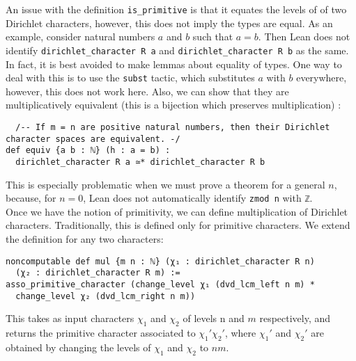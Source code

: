 \documentclass[11pt]{article}
\newcommand{\lean}[1]{\texttt{#1}\xspace} %
\begin{document}
An issue with the definition \lean{is\_primitive} is that it equates the levels of of two Dirichlet characters, 
however, this does not imply the types are equal. As an example, consider natural numbers $a$ and $b$ such that 
$a = b$. Then Lean does not identify \lean{dirichlet\_character R a} and \lean{dirichlet\_character R b} as the 
same. In fact, it is best avoided to make lemmas about equality of types. One way to deal with this is to use 
the \lean{subst} tactic, which substitutes $a$ with $b$ everywhere, however, this does not work here. Also, we 
can show that they are multiplicatively equivalent (this is a bijection which preserves multiplication) : 
\begin{lstlisting}
  /-- If m = n are positive natural numbers, then their Dirichlet character spaces are equivalent. -/
def equiv {a b : ℕ} (h : a = b) :
  dirichlet_character R a ≃* dirichlet_character R b
\end{lstlisting}

This is especially problematic when we must prove a theorem for a general $n$, because, for $n = 0$, Lean does 
not automatically identify \lean{zmod n} with \lean{ℤ}. \\
Once we have the notion of primitivity, we can define multiplication of Dirichlet characters. Traditionally, this is 
defined only for primitive characters. We extend the definition for any two characters: 
\begin{lstlisting}
noncomputable def mul {m n : ℕ} (χ₁ : dirichlet_character R n) 
  (χ₂ : dirichlet_character R m) :=
asso_primitive_character (change_level χ₁ (dvd_lcm_left n m) * 
  change_level χ₂ (dvd_lcm_right n m))
\end{lstlisting}
This takes as input characters $\chi_1$ and $\chi_2$ of levels n and $m$ respectively, and returns the primitive 
character associated to $\chi_1' \chi_2'$, where $\chi_1'$ and $\chi_2'$ are obtained by changing the levels 
of $\chi_1$ and $\chi_2$ to $n m$. 
\end{document}
